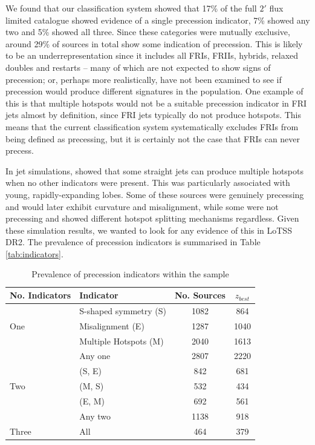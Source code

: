 \documentclass{aa}
\begin{document}
We found that our classification system showed that 17\% of the full $2'$ flux limited catalogue showed evidence of a single precession indicator, 7\% showed any two and 5\% showed all three. Since these categories were mutually exclusive, around 29\% of sources in total show some indication of precession. This is likely to be an underrepresentation since it includes all FRIs, FRIIs, hybrids, relaxed doubles and restarts -- many of which are not expected to show signs of precession; or, perhaps more realistically, have not been examined to see if precession would produce different signatures in the population. One example of this is that multiple hotspots would not be a suitable precession indicator in FRI jets almost by definition, since FRI jets typically do not produce hotspots. This means that the current classification system systematically excludes FRIs from being defined as precessing, but it is certainly not the case that FRIs can never precess. 

In jet simulations, \cite{horton23} showed that some straight jets can produce multiple hotspots when no other indicators were present. This was particularly associated with young, rapidly-expanding lobes. Some of these sources were genuinely precessing and would later exhibit curvature and misalignment, while some were not precessing and showed different hotspot splitting mechanisms regardless. Given these simulation results, we wanted to look for any evidence of this in LoTSS DR2. The prevalence of precession indicators is summarised in Table \ref{tab:indicators}.

\begin{table}[]
    \centering
     \caption{Prevalence of precession indicators within the sample}
     \label{tab:indicators}
    \begin{tabular}{l | l | c | c }
         No. Indicators & Indicator & No. Sources & $z_{best}$ \\
         \hline 
         \multirow{3}{*}{One}
         & S-shaped symmetry (S) & 1082 & 864 \\
         & Misalignment (E) & 1287 & 1040 \\
         & Multiple Hotspots (M) & 2040 & 1613 \\
         & Any one & 2807 & 2220 \\
         \hline 
         \multirow{3}{*}{Two}
         & (S, E) & 842 & 681 \\
         & (M, S) & 532 & 434 \\
         & (E, M) & 692 & 561 \\
         & Any two & 1138 & 918 \\
         \hline
         \multirow{1}{*}{Three}
         & All & 464 & 379 \\
         \end{tabular}  
    \label{tab:precession}
    \end{table}
\end{document}
